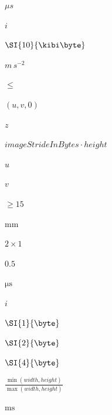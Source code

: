 \documentclass{article}
\begin{document}
$ \mu{}s $
\pagebreak

$ i $
\pagebreak

$ \SI{10}{\kibi\byte} $
\pagebreak

$m \, s^{-2}$
\pagebreak

$ \le $
\pagebreak

$ \left( u, v, 0 \right) $
\pagebreak

$ z $
\pagebreak

$ imageStrideInBytes \cdot height $
\pagebreak

$ u $
\pagebreak

$ v $
\pagebreak

$ \ge 15 $
\pagebreak

$\si{\milli\metre}$
\pagebreak

$ 2 \times 1 $
\pagebreak

$0.5$
\pagebreak

$\si{\micro\second}$
\pagebreak

$i$
\pagebreak

$ \SI{1}{\byte} $
\pagebreak

$ \SI{2}{\byte} $
\pagebreak

$ \SI{4}{\byte} $
\pagebreak

$ \frac{\operatorname{min}( width, height )}{\operatorname{max}( width, height )} $
\pagebreak

$\si{\milli\second}$
\pagebreak
\end{document}
